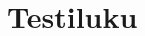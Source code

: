 \chapter{Testiluku}

\begin{kuvaajapohja}{2}{-3.14}{3.14}{-1.25}{1.25}
\end{kuvaajapohja}

\begin{lukusuora}{-1}{1}{10}
\end{lukusuora}
